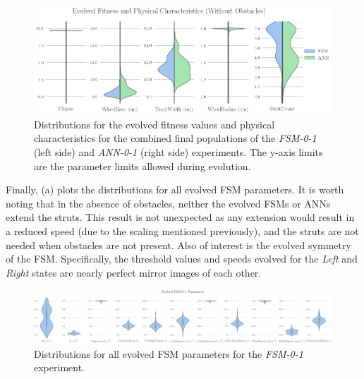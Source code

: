 \begin{figure}[!ht]
    \centering

    \includegraphics[width=\columnwidth]{figures/4-results/0-1-best_params.png}

    \vspace{-0.1in}

    \caption{Distributions for the evolved fitness values and physical characteristics for the combined final populations of the \emph{FSM-0-1} (left side) and \emph{ANN-0-1} (right side) experiments. The y-axis limits are the parameter limits allowed during evolution.}
    \label{fig:0-1-best-params}

    \vspace{-0.1in}

\end{figure}


Finally, (a) plots the distributions for all evolved FSM parameters.
%
It is worth noting that in the absence of obstacles, neither the evolved FSMs or ANNs extend the struts.
%
This result is not unexpected as any extension would result in a reduced speed (due to the scaling mentioned previously), and the struts are not needed when obstacles are not present.
%
Also of interest is the evolved symmetry of the FSM.
%
Specifically, the threshold values and speeds evolved for the \emph{Left} and \emph{Right} states are nearly perfect mirror images of each other.


\begin{figure}[!ht]
    \centering


    \includegraphics[width=\textwidth]{figures/4-results/FSM-0-1-best_params.png}

    \vspace{-0.08in}

    \caption{Distributions for all evolved FSM parameters for the \emph{FSM-0-1} experiment.}
    \label{fig:FSM-best-params}
\end{figure}


